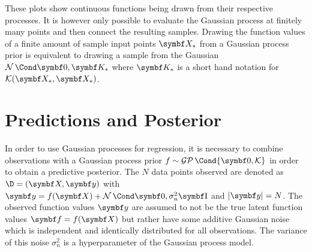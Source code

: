 These plots show continuous functions being drawn from their respective processes.
It is however only possible to evaluate the Gaussian process at finitely many points and then connect the resulting samples.
Drawing the function values of a finite amount of sample input points $\mat{X_\ast}$ from a Gaussian process prior is equivalent to drawing a sample from the Gaussian $\Gaussian{\mat{0}, \mat{K_\ast}}$ where $\mat{K_\ast}$ is a short hand notation for $\K(\mat{X_\ast}, \mat{X_\ast})$.

\section{Predictions and Posterior}
In order to use Gaussian processes for regression, it is necessary to combine observations with a Gaussian process prior $f \sim \GP\Cond{\mat{0}, \K}$ in order to obtain a predictive posterior.
The $N$ data points observed are denoted as $\D = \left( \mat{X}, \mat{y} \right)$ with $\mat{y} = f(\mat{X}) + \Gaussian{\mat{0}, \sigma_n^2 \Eye}$ and $\abs{\mat{y}} = N$.
The observed function values $\mat{y}$ are assumed to not be the true latent function values $\mat{f} = f(\mat{X})$ but rather have some additive Gaussian noise which is independent and identically distributed for all observations.
The variance of this noise $\sigma_n^2$ is a hyperparameter of the Gaussian process model.

